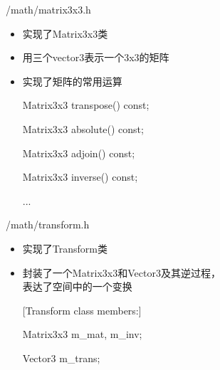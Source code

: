 \documentclass{beamer}
\begin{document}
\begin{frame} {/math/matrix3x3.h}
\begin{itemize} [<+->]
\item 实现了Matrix3x3类
\item 用三个vector3表示一个3x3的矩阵
\item 实现了矩阵的常用运算
\begin{semiverbatim} \small Matrix3x3 transpose() const; \end{semiverbatim}
\begin{semiverbatim} \small Matrix3x3 absolute() const; \end{semiverbatim}
\begin{semiverbatim} \small Matrix3x3 adjoin() const; \end{semiverbatim}
\begin{semiverbatim} \small Matrix3x3 inverse() const; \end{semiverbatim}
\begin{semiverbatim} \small ... \end{semiverbatim}
\end{itemize}
\end{frame}

\begin{frame} {/math/transform.h}
\begin{itemize} [<+->]
\item 实现了Transform类
\item 封装了一个Matrix3x3和Vector3及其逆过程，\\ 表达了空间中的一个变换
\begin{semiverbatim} \small [Transform class members:] \end{semiverbatim}
\begin{semiverbatim} \small Matrix3x3 m\_mat, m\_inv; \end{semiverbatim}
\begin{semiverbatim} \small Vector3 m\_trans; \end{semiverbatim}
\end{itemize}
\end{frame}
\end{document}
